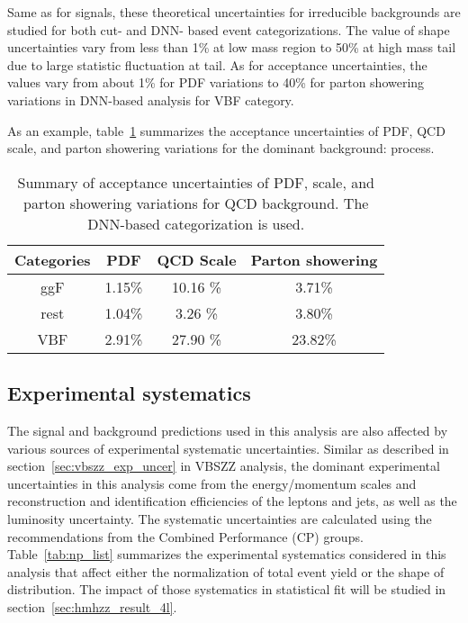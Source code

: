 Same as for signals, these theoretical uncertainties for irreducible backgrounds are studied for both cut- and DNN- based event categorizations.
The value of shape uncertainties vary from less than 1\% at low mass region to 50\% at high mass tail due to large statistic fluctuation at tail.
As for acceptance uncertainties, the values vary from about 1\% for PDF variations to 40\% for parton showering variations in DNN-based analysis for VBF category.

As an example, table~\ref{tab:acc-all-qqZZ_DNN} summarizes the acceptance uncertainties of PDF, QCD scale, and parton showering variations for the dominant background: \qqZZ process.

\begin{table}[htbp]
  \centering
  \caption{Summary of acceptance uncertainties of PDF, scale, and parton showering variations for QCD \qqZZ background. The DNN-based categorization is used.}
  \label{tab:acc-all-qqZZ_DNN}
  \begin{tabular}{cccc}
    \toprule
    Categories  & PDF    & QCD Scale   & Parton showering \\
    \midrule
    ggF  & 1.15\% & 10.16 \% & 3.71\% \\
    rest & 1.04\% & 3.26  \% & 3.80\% \\
    VBF  & 2.91\% & 27.90 \% & 23.82\% \\
    \bottomrule
  \end{tabular}
\end{table}

\subsection{Experimental systematics}

The signal and background predictions used in this analysis are also affected by various sources of experimental systematic uncertainties.
Similar as described in section~\ref{sec:vbszz_exp_uncer} in VBSZZ analysis, the dominant experimental uncertainties in this analysis come from the energy/momentum scales 
and reconstruction and identification efficiencies of the leptons and jets, as well as the luminosity uncertainty.
The systematic uncertainties are calculated using the recommendations from the Combined Performance (CP) groups.
Table~\ref{tab:np_list} summarizes the experimental systematics considered in this analysis that affect either the normalization of total event yield or the shape of \mfl distribution.
The impact of those systematics in statistical fit will be studied in section~\ref{sec:hmhzz_result_4l}.

